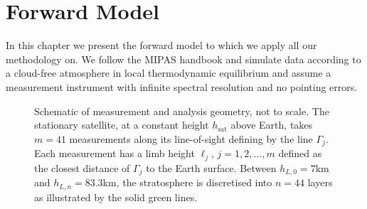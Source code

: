 \chapter{Forward Model}
\label{ch:formodel}
In this chapter we present the forward model to which we apply all our methodology on. We follow the MIPAS handbook \cite{mipas2000handbook} and simulate data according to a cloud-free atmosphere in local thermodynamic equilibrium and assume a measurement instrument with infinite spectral resolution and no pointing errors.
\begin{figure}[ht!]
	\centering
	
	\caption[Schematic of measurement and analysis geometry.]{Schematic of measurement and analysis geometry, not to scale.
		The stationary satellite, at a constant height $h_\text{sat}$ above Earth, takes $m = 41$ measurements along its line-of-sight defining by the line $\Gamma_j$.
		Each measurement has a limb height $\ell_j$, $j=1,2,\dots,m$ defined as the closest distance of $\Gamma_j$ to the Earth surface.
		Between $h_{L,0} = 7$km and $h_{L,n} = 83.3$km, the stratosphere is discretised into $n =44$ layers as illustrated by the solid green lines.}
	\label{fig:LIMB}
\end{figure}


